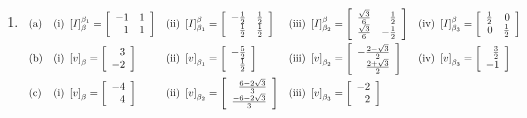 \documentclass{report}
\begin{document}
\begin{enumerate}
\item  $
\begin{array}[t]{lllll}
\text{(a)} & \text{(i) }\left[ I\right] _{\beta }^{\beta _{1}}=\left[
\begin{array}{rr}
-1 & 1 \\
1 & 1
\end{array}
\right]  & \text{(ii) }\left[ I\right] _{\beta _{1}}^{\beta }=\left[
\begin{array}{rr}
-\frac{1}{2} & \frac{1}{2} \\
\frac{1}{2} & \frac{1}{2}
\end{array}
\right]  & \text{(iii) }\left[ I\right] _{\beta _{2}}^{\beta }=\left[
\begin{array}{rr}
\frac{\sqrt{3}}{6} & \frac{1}{2} \\
\frac{\sqrt{3}}{6} & -\frac{1}{2}
\end{array}
\right]  & \text{(iv) }\left[ I\right] _{\beta _{3}}^{\beta }=\left[
\begin{array}{rr}
\frac{1}{2} & 0 \\
0 & \frac{1}{2}
\end{array}
\right] \smallskip  \\
\text{(b)} & \text{(i) }\left[ v\right] _{\beta }=\left[
\begin{array}{r}
3 \\
-2
\end{array}
\right]  & \text{(ii) }\left[ v\right] _{\beta _{1}}=\left[
\begin{array}{r}
-\frac{5}{2} \\
\frac{1}{2}
\end{array}
\right]  & \text{(iii) }\left[ v\right] _{\beta _{2}}=\left[
\begin{array}{r}
-\frac{2-\sqrt{3}}{2} \\
\frac{2+\sqrt{3}}{2}
\end{array}
\right]  & \text{(iv) }\left[ v\right] _{\beta _{3}}=\left[
\begin{array}{r}
\frac{3}{2} \\
-1
\end{array}
\right] \smallskip  \\
\text{(c)} & \text{(i) }\left[ v\right] _{\beta }=\left[
\begin{array}{r}
-4 \\
4
\end{array}
\right]  & \text{(ii) }\left[ v\right] _{\beta _{2}}=\left[
\begin{array}{r}
\frac{6-2\sqrt{3}}{3} \\
\frac{-6-2\sqrt{3}}{3}
\end{array}
\right]  & \text{(iii) }\left[ v\right] _{\beta _{3}}=\left[
\begin{array}{r}
-2 \\
2
\end{array}
\right]  & \smallskip
\end{array}
$


\end{enumerate}
\end{document}
